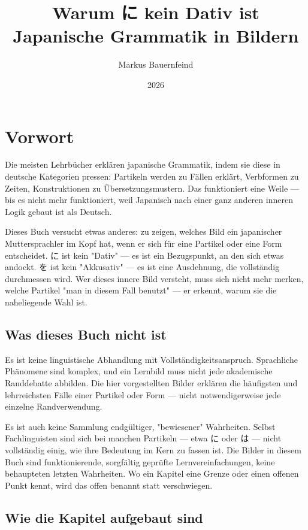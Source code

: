 \documentclass[12pt]{book}
\title{Warum に kein Dativ ist\\\large Japanische Grammatik in Bildern}
\author{Markus Bauernfeind}
\date{2026}
\begin{document}
\pagestyle{plain}
\maketitle
\tableofcontents

\chapter{Vorwort}

Die meisten Lehrbücher erklären japanische Grammatik, indem sie diese in deutsche Kategorien pressen: Partikeln werden zu Fällen erklärt, Verbformen zu Zeiten, Konstruktionen zu Übersetzungsmustern. Das funktioniert eine Weile — bis es nicht mehr funktioniert, weil Japanisch nach einer ganz anderen inneren Logik gebaut ist als Deutsch.

Dieses Buch versucht etwas anderes: zu zeigen, welches Bild ein japanischer Muttersprachler im Kopf hat, wenn er sich für eine Partikel oder eine Form entscheidet. に ist kein "Dativ" — es ist ein Bezugspunkt, an den sich etwas andockt. を ist kein "Akkusativ" — es ist eine Ausdehnung, die vollständig durchmessen wird. Wer dieses innere Bild versteht, muss sich nicht mehr merken, welche Partikel "man in diesem Fall benutzt" — er erkennt, warum sie die naheliegende Wahl ist.

\section*{Was dieses Buch nicht ist}

Es ist keine linguistische Abhandlung mit Vollständigkeitsanspruch. Sprachliche Phänomene sind komplex, und ein Lernbild muss nicht jede akademische Randdebatte abbilden. Die hier vorgestellten Bilder erklären die häufigsten und lehrreichsten Fälle einer Partikel oder Form — nicht notwendigerweise jede einzelne Randverwendung.

Es ist auch keine Sammlung endgültiger, "bewiesener" Wahrheiten. Selbst Fachlinguisten sind sich bei manchen Partikeln — etwa に oder は — nicht vollständig einig, wie ihre Bedeutung im Kern zu fassen ist. Die Bilder in diesem Buch sind funktionierende, sorgfältig geprüfte Lernvereinfachungen, keine behaupteten letzten Wahrheiten. Wo ein Kapitel eine Grenze oder einen offenen Punkt kennt, wird das offen benannt statt verschwiegen.

\section*{Wie die Kapitel aufgebaut sind}
\end{document}
